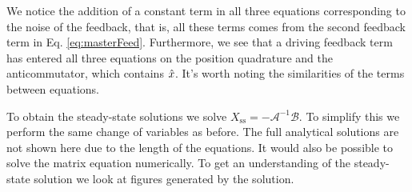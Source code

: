 We notice the addition of a constant term in all three equations corresponding to the noise of the feedback, that is, all these terms comes from the second feedback term in Eq. \eqref{eq:masterFeed}. Furthermore, we see that a driving feedback term has entered all three equations on the position quadrature and the anticommutator, which contains $\hat{x}$. It's worth noting the similarities of the terms between equations.

To obtain the steady-state solutions we solve $X_\text{ss} = - \mathcal{A}^{-1} \mathcal{B}$. To simplify this we perform the same change of variables as before. The full analytical solutions are not shown here due to the length of the equations. It would also be possible to solve the matrix equation numerically. To get an understanding of the steady-state solution we look at figures generated by the solution.

